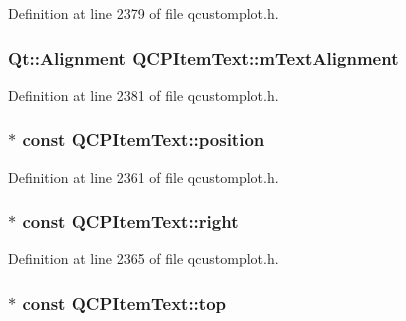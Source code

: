 Definition at line 2379 of file qcustomplot.\-h.

\hypertarget{class_q_c_p_item_text_acdb2e50c38e83da00f083771efbd213f}{
\subsubsection[{m\-Text\-Alignment}]{\setlength{\rightskip}{0pt plus 5cm}Qt\-::\-Alignment Q\-C\-P\-Item\-Text\-::m\-Text\-Alignment\hspace{0.3cm}{\ttfamily [protected]}}}\label{class_q_c_p_item_text_acdb2e50c38e83da00f083771efbd213f}


Definition at line 2381 of file qcustomplot.\-h.

\hypertarget{class_q_c_p_item_text_a0d228a00e819022b5690c65762721129}{
\subsubsection[{position}]{$\ast$ const Q\-C\-P\-Item\-Text\-::position}}\label{class_q_c_p_item_text_a0d228a00e819022b5690c65762721129}


Definition at line 2361 of file qcustomplot.\-h.

\hypertarget{class_q_c_p_item_text_aef159622ce6502412e782a21ba6d84f2}{
\subsubsection[{right}]{$\ast$ const Q\-C\-P\-Item\-Text\-::right}}\label{class_q_c_p_item_text_aef159622ce6502412e782a21ba6d84f2}


Definition at line 2365 of file qcustomplot.\-h.

\hypertarget{class_q_c_p_item_text_a5c87ee162cbbe3d166b97826c8849304}{
\subsubsection[{top}]{$\ast$ const Q\-C\-P\-Item\-Text\-::top}}\label{class_q_c_p_item_text_a5c87ee162cbbe3d166b97826c8849304}


